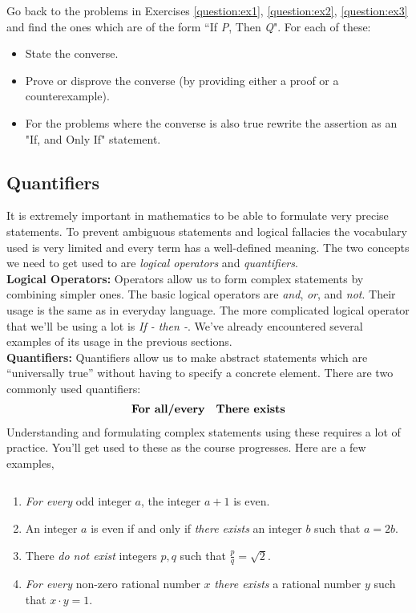 \begin{exercise}
	Go back to the problems in Exercises \ref{question:ex1}, \ref{question:ex2}, \ref{question:ex3} and find the ones which are of the form ``If \textit{P}, Then \textit{Q}". For each of these:
	\begin{itemize}
		\item State the converse.
		\item Prove or disprove the converse (by providing either a proof or a counterexample).
		\item For the problems where the converse is also true rewrite the assertion as an "If, and Only If" statement.
	\end{itemize}
\end{exercise}








\subsection{Quantifiers}
It is extremely important in mathematics to be able to formulate very precise statements. To prevent ambiguous statements and logical fallacies the vocabulary used is very limited and every term has a well-defined meaning. The two concepts we need to get used to are {\it logical operators} and {\it quantifiers}.\\

{\bf Logical Operators:} Operators allow us to form complex statements by combining simpler ones. The basic logical operators are {\it and}, {\it or}, and {\it not}. Their usage is the same as in everyday language. The more complicated logical operator that we'll be using a lot is {\it If - then -}. We've already encountered several examples of its usage in the previous sections.\\


{\bf Quantifiers:} Quantifiers allow us to make abstract statements which are ``universally true'' without having to specify a concrete element. There are two commonly used	quantifiers:
\begin{align*}
	\mbox{\textbf{For all/every}} && \mbox{\textbf{There exists}}
\end{align*}
Understanding and formulating complex statements using these requires a lot of practice. You'll get used to these as the course progresses. Here are a few examples,
\begin{example}$ $
	\begin{enumerate}
		\item \emph{For every} odd integer $a$, the integer $a+1$ is even.
		\item An integer $a$ is even if and only if \emph{there exists} an integer $b$ such that $a = 2b$.
		\item There \emph{do not exist} integers $p,q$ such that $\frac{p}{q} = \sqrt{2}$.
		\item \emph{For every} non-zero rational number $x$ \emph{there exists} a rational number $y$ such that $x \cdot y = 1$.
	\end{enumerate}
\end{example}

